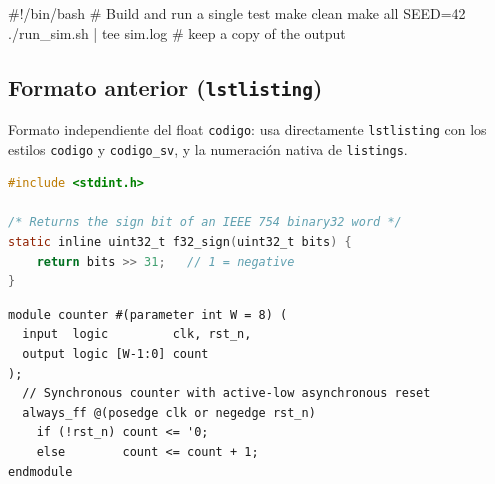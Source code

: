 \begin{codigo}
\begin{MinBashcapcode}
#!/bin/bash
# Build and run a single test
make clean
make all SEED=42
./run_sim.sh | tee sim.log   # keep a copy of the output
\end{MinBashcapcode}
\caption{Ejemplo con \texttt{MinBashcapcode}.}
\label{lst:ej-mincap-bash}
\end{codigo}

\subsection{Formato anterior (\texttt{lstlisting})}
\label{subsec:ej-code-anterior}

Formato independiente del float \texttt{codigo}: usa directamente \texttt{lstlisting} con los estilos \texttt{codigo} y \texttt{codigo\_sv}, y la numeración nativa de \texttt{listings}.

\begin{lstlisting}[style=codigo, language=C,
  caption={Ejemplo con el formato anterior (\texttt{style=codigo}).},
  label=lst:ej-legacy-c]
#include <stdint.h>

/* Returns the sign bit of an IEEE 754 binary32 word */
static inline uint32_t f32_sign(uint32_t bits) {
    return bits >> 31;   // 1 = negative
}
\end{lstlisting}

\begin{lstlisting}[style=codigo_sv,
  caption={Ejemplo con el formato anterior (\texttt{style=codigo\_sv}).},
  label=lst:ej-legacy-sv]
module counter #(parameter int W = 8) (
  input  logic         clk, rst_n,
  output logic [W-1:0] count
);
  // Synchronous counter with active-low asynchronous reset
  always_ff @(posedge clk or negedge rst_n)
    if (!rst_n) count <= '0;
    else        count <= count + 1;
endmodule
\end{lstlisting}